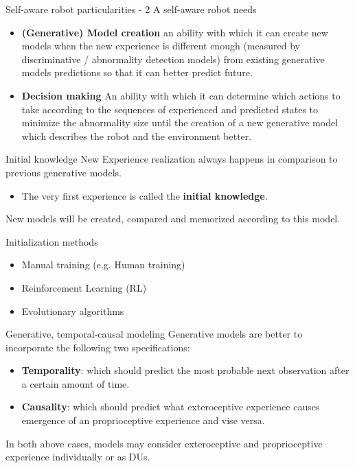 \documentclass[unknownkeysallowed]{beamer}
\begin{document}
	\begin{frame}{Self-aware robot particularities - 2}
		A self-aware robot needs 
		\begin{itemize}
			\item \textbf{ (Generative) Model creation} an ability with which it can create new models when the new experience is different enough (measured by discriminative / abnormality detection models) from existing generative models predictions so that it can better predict future.
			\item \textbf{Decision making} An ability with which it can determine which actions to take according to the sequences of experienced and predicted states to minimize the abnormality size until the creation of a new generative model which describes the robot and the environment better.
		\end{itemize}
	\end{frame}

	\begin{frame}{Initial knowledge}
		New Experience realization always happens in comparison to previous generative models. 
		\begin{itemize}
			\item The very first experience is called the \textbf{initial knowledge}.  
		\end{itemize}
		New models will be created, compared and memorized according to this model.
	\end{frame}

	\begin{frame}{Initialization methods}
		\begin{itemize}
			\item Manual training (e.g. Human training)
			\item Reinforcement Learning (RL)
			\item Evolutionary algorithms
		\end{itemize}
	\end{frame}

	\begin{frame}{Generative, temporal-causal modeling}
		Generative models are better to incorporate the following two specifications:
		\begin{itemize}
			\item \textbf{Temporality}: which should predict the most probable next observation after a certain amount of time.
			\item \textbf{Causality}: which should predict what exteroceptive experience causes emergence of an proprioceptive experience and vise versa.
		\end{itemize}
		In both above cases, models may consider exteroceptive and proprioceptive experience individually or as DUs.  
	\end{frame}
\end{document}
